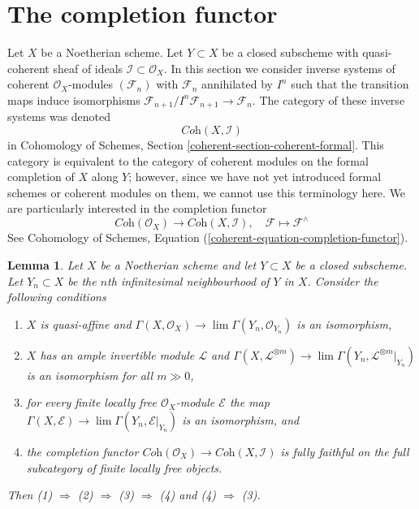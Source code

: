 \documentclass{stacks-project}
\theoremstyle{plain}
\newtheorem{lemma}[subsection]{Lemma}
\theoremstyle{definition}
\theoremstyle{remark}
\numberwithin{equation}{subsection}
\def\lim{\mathop{\mathrm{lim}}\nolimits}
\begin{document}
\section{The completion functor}
\label{section-completion}

\noindent
Let $X$ be a Noetherian scheme. Let $Y \subset X$ be a closed subscheme
with quasi-coherent sheaf of ideals $\mathcal{I} \subset \mathcal{O}_X$.
In this section we consider inverse systems of coherent
$\mathcal{O}_X$-modules $(\mathcal{F}_n)$ with $\mathcal{F}_n$
annihilated by $I^n$ such that the transition maps induce
isomorphisms $\mathcal{F}_{n + 1}/I^n\mathcal{F}_{n + 1} \to \mathcal{F}_n$.
The category of these inverse systems was denoted
$$
\textit{Coh}(X, \mathcal{I})
$$
in Cohomology of Schemes, Section \ref{coherent-section-coherent-formal}.
This category is equivalent to the category of coherent modules
on the formal completion of $X$ along $Y$; however, since we have
not yet introduced formal schemes or coherent modules on them,
we cannot use this terminology here. We are particularly interested
in the completion functor
$$
\textit{Coh}(\mathcal{O}_X)
\longrightarrow
\textit{Coh}(X, \mathcal{I}),\quad
\mathcal{F} \longmapsto \mathcal{F}^\wedge
$$
See
Cohomology of Schemes, Equation (\ref{coherent-equation-completion-functor}).

\begin{lemma}
\label{lemma-completion-fully-faithful}
Let $X$ be a Noetherian scheme and let $Y \subset X$ be a closed subscheme.
Let $Y_n \subset X$ be the $n$th infinitesimal neighbourhood of $Y$ in $X$.
Consider the following conditions
\begin{enumerate}
\item $X$ is quasi-affine and
$\Gamma(X, \mathcal{O}_X) \to \lim \Gamma(Y_n, \mathcal{O}_{Y_n})$
is an isomorphism,
\item $X$ has an ample invertible module $\mathcal{L}$ and
$\Gamma(X, \mathcal{L}^{\otimes m}) \to
\lim \Gamma(Y_n, \mathcal{L}^{\otimes m}|_{Y_n})$
is an isomorphism for all $m \gg 0$,
\item for every finite locally free $\mathcal{O}_X$-module
$\mathcal{E}$ the map
$\Gamma(X, \mathcal{E}) \to \lim \Gamma(Y_n, \mathcal{E}|_{Y_n})$
is an isomorphism, and
\item the completion functor
$\textit{Coh}(\mathcal{O}_X) \to \textit{Coh}(X, \mathcal{I})$
is fully faithful on the full subcategory of finite locally free
objects.
\end{enumerate}
Then (1) $\Rightarrow$ (2) $\Rightarrow$ (3) $\Rightarrow$ (4)
and (4) $\Rightarrow$ (3).
\end{lemma}
\end{document}
